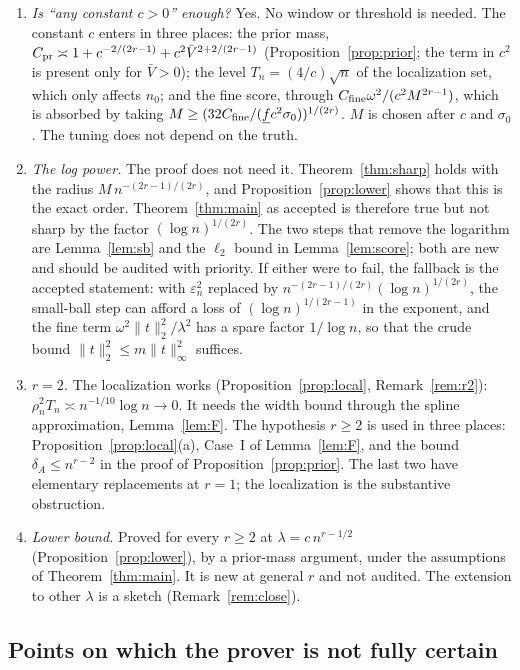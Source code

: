 \documentclass[11pt]{article}
\theoremstyle{definition}
\theoremstyle{remark}
\newcommand{\om}{\omega}
\newcommand{\en}{\varepsilon_n}
\newcommand{\fl}{\underline f}
\newcommand{\Vb}{\bar V}
\begin{document}
\begin{enumerate}[itemsep=3pt,topsep=3pt,label=\textbf{\arabic*.}]
\item \emph{Is ``any constant $c>0$'' enough?} Yes. No window or threshold is needed. The constant $c$ enters in three places: the prior mass, $C_{\rm pr}\asymp1+c^{-2/(2r-1)}+c^2\Vb^{2+2/(2r-1)}$ (Proposition~\ref{prop:prior}; the term in $c^2$ is present only for $\Vb>0$); the level $T_n=(4/c)\sqrt n$ of the localization set, which only affects $n_0$; and the fine score, through $C_{\rm fine}\om^2/(c^2M^{2r-1})$, which is absorbed by taking $M\ge(32C_{\rm fine}/(\fl c^2\sigma_0))^{1/(2r)}$. $M$ is chosen after $c$ and $\sigma_0$. The tuning does not depend on the truth.
\item \emph{The log power.} The proof does not need it. Theorem~\ref{thm:sharp} holds with the radius $M\,n^{-(2r-1)/(2r)}$, and Proposition~\ref{prop:lower} shows that this is the exact order. Theorem~\ref{thm:main} as accepted is therefore true but not sharp by the factor $(\log n)^{1/(2r)}$. The two steps that remove the logarithm are Lemma~\ref{lem:sb} and the $\ell_2$ bound in Lemma~\ref{lem:score}; both are new and should be audited with priority. If either were to fail, the fallback is the accepted statement: with $\en^2$ replaced by $n^{-(2r-1)/(2r)}(\log n)^{1/(2r)}$, the small-ball step can afford a loss of $(\log n)^{1/(2r-1)}$ in the exponent, and the fine term $\om^2\|t\|_2^2/\lambda^2$ has a spare factor $1/\log n$, so that the crude bound $\|t\|_2^2\le m\|t\|_\infty^2$ suffices.
\item \emph{$r=2$.} The localization works (Proposition~\ref{prop:local}, Remark~\ref{rem:r2}): $\rho_n^2T_n\asymp n^{-1/10}\log n\to0$. It needs the width bound through the spline approximation, Lemma~\ref{lem:F}. The hypothesis $r\ge2$ is used in three places: Proposition~\ref{prop:local}(a), Case~I of Lemma~\ref{lem:F}, and the bound $\delta_A\le n^{r-2}$ in the proof of Proposition~\ref{prop:prior}. The last two have elementary replacements at $r=1$; the localization is the substantive obstruction.
\item \emph{Lower bound.} Proved for every $r\ge2$ at $\lambda=c\,n^{r-1/2}$ (Proposition~\ref{prop:lower}), by a prior-mass argument, under the assumptions of Theorem~\ref{thm:main}. It is new at general $r$ and not audited. The extension to other $\lambda$ is a sketch (Remark~\ref{rem:close}).
\end{enumerate}

\subsection{Points on which the prover is not fully certain}
\end{document}
